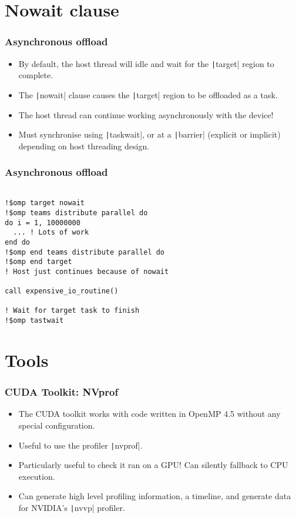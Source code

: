 \documentclass{beamer}
\begin{document}
\section{Nowait clause}
\begin{frame}
\frametitle{Asynchronous offload}
\begin{itemize}
  \item By default, the host thread will idle and wait for the \texttt|target| region to complete.
  \item The \texttt|nowait| clause causes the \texttt|target| region to be offloaded as a task.
  \item The host thread can continue working asynchronously with the device!
  \item Must synchronise using \texttt|taskwait|, or at a \texttt|barrier| (explicit or implicit) depending on host threading design.
\end{itemize}
\end{frame}

\begin{frame}[fragile]
\frametitle{Asynchronous offload}
\begin{verbatim}

!$omp target nowait
!$omp teams distribute parallel do
do i = 1, 10000000
  ... ! Lots of work
end do
!$omp end teams distribute parallel do
!$omp end target
! Host just continues because of nowait

call expensive_io_routine()

! Wait for target task to finish
!$omp tastwait

\end{verbatim}
\end{frame}

\section{Tools}
\begin{frame}
\frametitle{CUDA Toolkit: NVprof}
\begin{itemize}
  \item The CUDA toolkit works with code written in OpenMP 4.5 without any special configuration.
  \item Useful to use the profiler \texttt|nvprof|.
  \item Particularly useful to check it ran on a GPU! Can silently fallback to CPU execution.
  \item Can generate high level profiling information, a timeline, and generate data for NVIDIA's \texttt|nvvp| profiler.
\end{itemize}
\end{frame}
\end{document}
